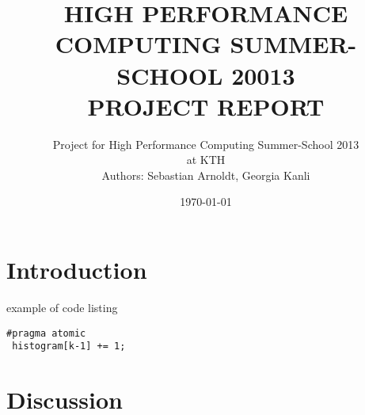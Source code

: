 \documentclass[a4paper,12pt]{article}
\title{\textbf{HIGH PERFORMANCE COMPUTING SUMMER-SCHOOL 20013 \\ PROJECT REPORT}}
\author{Project for High Performance Computing Summer-School 2013 \\ at KTH\\ Authors: Sebastian Arnoldt, Georgia Kanli}
\date{\today}
\begin{document}
\maketitle
\thispagestyle{empty}
\newpage
\setcounter{page}{1}
\tableofcontents
\newpage

\section{Introduction}


example of code listing

\begin{lstlisting}
#pragma atomic
 histogram[k-1] += 1;
\end{lstlisting}


 
\section{Discussion}
\end{document}
